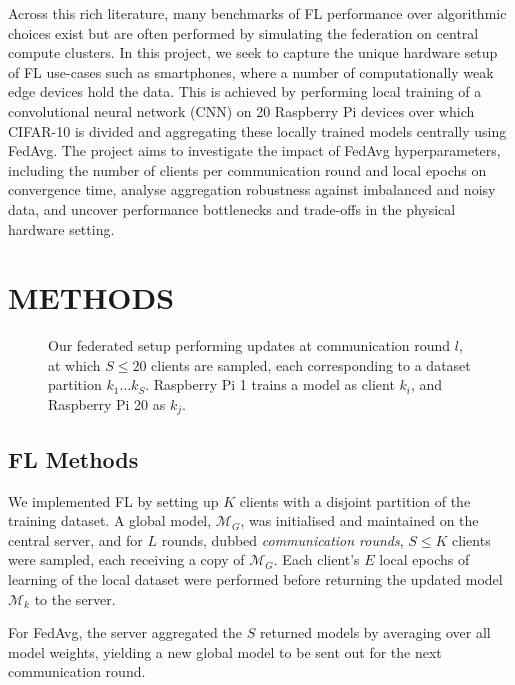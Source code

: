 \documentclass{article}
\begin{document}
Across this rich literature, many benchmarks of FL performance over algorithmic choices exist but are often performed by simulating the federation on central compute clusters.
In this project, we seek to capture the unique hardware setup of FL use-cases such as smartphones, where a number of computationally weak edge devices hold the data.
This is achieved by performing local training of a convolutional neural network (CNN) on 20 Raspberry Pi devices over which CIFAR-10 \cite{alex2009learning} is divided and aggregating these locally trained models centrally using FedAvg.
The project aims to investigate the impact of FedAvg hyperparameters, including the number of clients per communication round and local epochs on convergence time, analyse aggregation robustness against imbalanced and noisy data, and uncover performance bottlenecks and trade-offs in the physical hardware setting.

\section{METHODS}%
\label{sec:methods}

\begin{figure}[htb!]
    \centering
    
    \caption{
        Our federated setup performing updates at communication round $l$, at which $S\leq 20$ clients are sampled, each corresponding to a dataset partition $k_1\ldots k_{S}$.
        Raspberry Pi 1 trains a model as client $k_i$, and Raspberry Pi 20 as $k_j$.
    }
    \label{fig:setup}
\end{figure}\noindent

\subsection{FL Methods}
We implemented FL by setting up $K$ clients with a disjoint partition of the training dataset.
A global model, $\mathcal M_G$, was initialised and maintained on the central server, and for $L$ rounds, dubbed \emph{communication rounds}, $S \leq K$ clients were sampled, each receiving a copy of $\mathcal M_G$.
Each client's $E$ local epochs of learning of the local dataset were performed before returning the updated model $\mathcal M_k$ to the server.

For FedAvg, the server aggregated the $S$ returned models by averaging over all model weights, yielding a new global model to be sent out for the next communication round.
\end{document}
